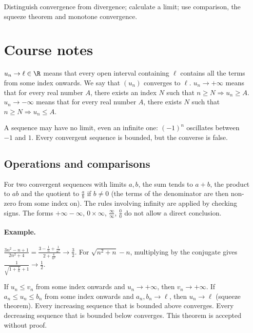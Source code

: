 \label{ch:2}


\begin{keypoint}[Objectives]Distinguish convergence from divergence; calculate a limit; use comparison, the squeeze theorem and monotone convergence.\end{keypoint}

\section{Course notes}
\begin{keypoint}[Definitions]
$u_n\to\ell\in\R$ means that every open interval containing $\ell$ contains all the terms from some index onwards. We say that $(u_n)$ converges to $\ell$.
$u_n\to+\infty$ means that for every real number $A$, there exists an index $N$ such that $n\ge N\Rightarrow u_n\ge A$. $u_n\to-\infty$ means that for every real number $A$, there exists $N$ such that $n\ge N\Rightarrow u_n\le A$.
\end{keypoint}
A sequence may have no limit, even an infinite one: $(-1)^n$ oscillates between $-1$ and $1$. Every convergent sequence is bounded, but the converse is false.
\subsection{Operations and comparisons}
For two convergent sequences with limits $a,b$, the sum tends to $a+b$, the product to $ab$ and the quotient to $\frac{a}{b}$ if $b\ne0$ (the terms of the denominator are then non-zero from some index on). The rules involving infinity are applied by checking signs. The forms $+\infty-\infty$, $0\times\infty$, $\frac{\infty}{\infty}$, $\frac{0}{0}$ do not allow a direct conclusion.
\paragraph{Example.} $\frac{3n^2-n+1}{2n^2+4}=\frac{3-\frac{1}{n}+\frac{1}{n^2}}{2+\frac{4}{n^2}}\to\frac{3}{2}$. For $\sqrt{n^2+n}-n$, multiplying by the conjugate gives $\frac{1}{\sqrt{1+\frac{1}{n}}+1}\to\frac{1}{2}$.
\begin{keypoint}[Theorems]
If $u_n\le v_n$ from some index onwards and $u_n\to+\infty$, then $v_n\to+\infty$. If $a_n\le u_n\le b_n$ from some index onwards and $a_n,b_n\to\ell$, then $u_n\to\ell$ (squeeze theorem).
Every increasing sequence that is bounded above converges. Every decreasing sequence that is bounded below converges. This theorem is accepted without proof.
\end{keypoint}
